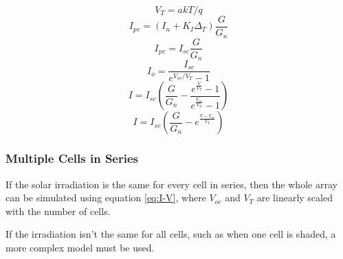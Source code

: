 \begin{minipage}{0.3\textwidth}
    \begin{equation} \label{eq:thermalvoltage}
        V_T = a k T / q
    \end{equation}
    \begin{equation} \label{eq:cellcurrent}
        I_{pv} = \left( I_n + K_I \Delta_T \right) \frac{G}{G_n}
    \end{equation}
    \begin{equation} \label{eq:I_pv}
        I_{pv} = I_{sc} \frac{G}{G_n}
    \end{equation}
    \begin{equation} \label{eq:I_o}
        I_o = \frac{I_{sc}}{e^{V_{oc} / V_T} - 1}
    \end{equation}
    \begin{equation} \label{eq:IAlmostDone}
        I = I_{sc} \left( \frac{G}{G_n} - \frac{e^{\frac{V}{V_T}}-1}{e^{\frac{V_{oc}}{V_T}}-1} \right)
    \end{equation}
    \begin{equation} \label{eq:I-V}
        I = I_{sc} \left( \frac{G}{G_n} - e^{\frac{V - V_{oc}}{V_T}} \right)
    \end{equation}
\end{minipage}



\subsubsection{Multiple Cells in Series}

If the solar irradiation is the same  for  every  cell in series, then the whole
array  can be simulated using equation \eqref{eq:I-V}, where $V_{oc}$  and  $V_T$
are linearly scaled with the number of cells.

If the irradiation isn't the same for all  cells,  such  as  when  one  cell  is
shaded, a more complex model must be used.

